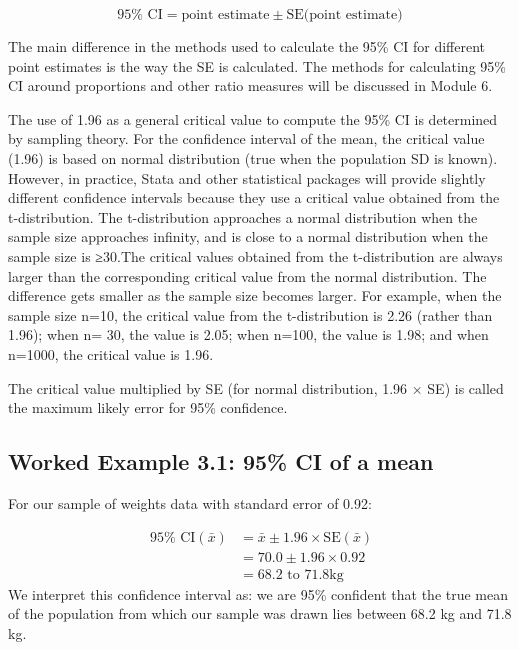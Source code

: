 \documentclass[
]{memoir}
\begin{document}
\[ 95\% \text{ CI} = \text{point estimate} \pm \text{SE}(\text{point estimate)} \]

The main difference in the methods used to calculate the 95\% CI for different point estimates is the way the SE is calculated. The methods for calculating 95\% CI around proportions and other ratio measures will be discussed in Module 6.

The use of 1.96 as a general critical value to compute the 95\% CI is determined by sampling theory. For the confidence interval of the mean, the critical value (1.96) is based on normal distribution (true when the population SD is known). However, in practice, Stata and other statistical packages will provide slightly different confidence intervals because they use a critical value obtained from the t-distribution. The t-distribution approaches a normal distribution when the sample size approaches infinity, and is close to a normal distribution when the sample size is ≥30.The critical values obtained from the t-distribution are always larger than the corresponding critical value from the normal distribution. The difference gets smaller as the sample size becomes larger. For example, when the sample size n=10, the critical value from the t-distribution is 2.26 (rather than 1.96); when n= 30, the value is 2.05; when n=100, the value is 1.98; and when n=1000, the critical value is 1.96.

The critical value multiplied by SE (for normal distribution, 1.96 × SE) is called the maximum likely error for 95\% confidence.

\hypertarget{worked-example-3.1-95-ci-of-a-mean}{%
\subsection{Worked Example 3.1: 95\% CI of a mean}\label{worked-example-3.1-95-ci-of-a-mean}}

For our sample of weights data with standard error of 0.92:

\[
\begin{aligned}
\ 95\% \text{ CI}(\bar{x}) &=  \bar{x} \pm 1.96 \times \text{SE}(\bar{x}) \\
 &= 70.0 \pm 1.96 \times 0.92 \\
 &= 68.2 \text{ to } 71.8 \text{kg}
\end{aligned}
\]
We interpret this confidence interval as: we are 95\% confident that the true mean of the population from which our sample was drawn lies between 68.2 kg and 71.8 kg.
\end{document}
